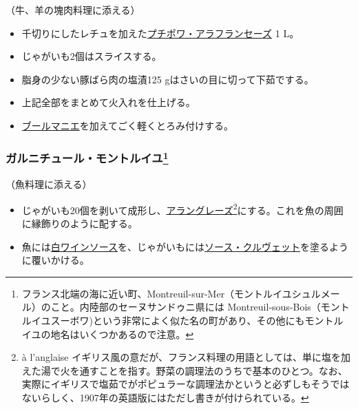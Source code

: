 \begin{recette}


（牛、羊の塊肉料理に添える）

\begin{itemize}
\item
  千切りにしたレチュを加えた\protect\hyperlink{petits-pois-francaise}{プチポワ・アラフランセーズ}
  1 L。
\item
  じゃがいも2個はスライスする。
\item
  脂身の少ない豚ばら肉の塩漬125 gはさいの目に切って下茹でする。
\item
  上記全部をまとめて火入れを仕上げる。
\item
  \protect\hyperlink{beurre-manie}{ブールマニエ}を加えてごく軽くとろみ付けする。
\end{itemize}

\atoaki{}

\hypertarget{garniture-montreuil}{%
\subsubsection[ガルニチュール・モントルイユ]{\texorpdfstring{ガルニチュール・モントルイユ\footnote{フランス北端の海に近い町、Montreuil-sur-Mer（モントルイユシュルメール）のこと。内陸部のセーヌサンドゥニ県には
  Montreuil-sous-Bois（モントルイユスーボワ)という非常によく似た名の町があり、その他にもモントルイユの地名はいくつかあるので注意。}}{ガルニチュール・モントルイユ}}\label{garniture-montreuil}}


  

（魚料理に添える）

\begin{itemize}
\item
  じゃがいも20個を剥いて成形し、\protect\hyperlink{pommes-de-terres-anglaise}{アラングレーズ}\footnote{à
    l'anglaise
    イギリス風の意だが、フランス料理の用語としては、単に塩を加えた湯で火を通すことを指す。野菜の調理法のうちで基本のひとつ。なお、実際にイギリスで塩茹でがポピュラーな調理法かというと必ずしもそうではないらしく、1907年の英語版にはただし書きが付けられている。}にする。これを魚の周囲に縁飾りのように配する。
\item
  魚には\protect\hyperlink{sauce-vin-blanc}{白ワインソース}を、じゃがいもには\protect\hyperlink{sauce-aux-crevettes}{ソース・クルヴェット}を塗るように覆いかける。
\end{itemize}


\end{recette}

